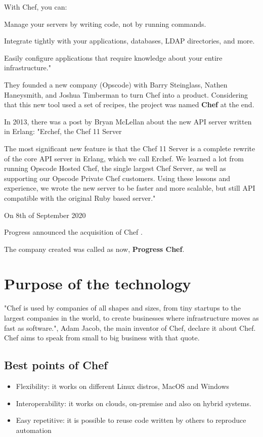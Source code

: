 \documentclass[12pt,a4paper,openright,twoside]{book}
\begin{document}
With Chef, you can:

Manage your servers by writing code, not by running commands. 


Integrate tightly with your applications, databases, LDAP directories, and more.


Easily configure applications that require knowledge about your entire infrastructure."
\cite{chefStory}

They founded a new company (Opscode) with Barry Steinglass, Nathen Haneysmith, and Joshua Timberman to turn Chef into a product.
Considering that this new tool used a set of recipes, the project was named \textbf{Chef} at the end.

In 2013, there was a post by Bryan McLellan about the new API server written in Erlang:
"Erchef, the Chef 11 Server


The most significant new feature is that the Chef 11 Server is a complete rewrite of the core API server in Erlang, which we call Erchef.
We learned a lot from running Opscode Hosted Chef, the single largest Chef Server, as well as supporting our Opscode Private Chef customers.
Using these lessons and experience, we wrote the new server to be faster and more scalable, but still API compatible with the original Ruby based server."\cite{chefStory2}

On 8th of September 2020

Progress announced the acquisition of Chef \cite{chefStory3}.

The company created was called as now, \textbf{Progress Chef}.


\section{Purpose of the technology}
"Chef is used by companies of all shapes and sizes, from tiny startups to the largest companies in the world, to create businesses where infrastructure moves as fast as software.", Adam Jacob, the main inventor of Chef, declare it about Chef.
Chef aims to speak from small to big business with that quote.

\subsection{Best points of Chef}

\begin{itemize}
\item{Flexibility}: it works on different Linux distros, MacOS and Windows
\item{Interoperability}: it works on clouds, on-premise and also on hybrid systems.
\item{Easy repetitive}: it is possible to reuse code written by others to reproduce automation
\end{itemize}
\end{document}

